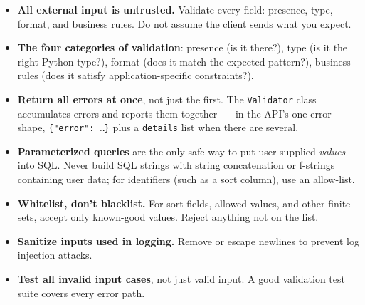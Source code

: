 \label{31-input-handling:key-takeaways}
\begin{takeaways}

\begin{itemize}
\tightlist
\item
  \textbf{All external input is untrusted.} Validate every field: presence, type, format, and business rules. Do not assume the client sends what you expect.
\item
  \textbf{The four categories of validation}: presence (is it there?), type (is it the right Python type?), format (does it match the expected pattern?), business rules (does it satisfy application-specific constraints?).
\item
  \textbf{Return all errors at once}, not just the first. The \texttt{Validator} class accumulates errors and reports them together~--- in the API's one error shape, \texttt{\{"error":\ …\}} plus a \texttt{details} list when there are several.
\item
  \textbf{Parameterized queries} are the only safe way to put user-supplied \emph{values} into SQL. Never build SQL strings with string concatenation or f-strings containing user data; for identifiers (such as a sort column), use an allow-list.
\item
  \textbf{Whitelist, don't blacklist.} For sort fields, allowed values, and other finite sets, accept only known-good values. Reject anything not on the list.
\item
  \textbf{Sanitize inputs used in logging.} Remove or escape newlines to prevent log injection attacks.
\item
  \textbf{Test all invalid input cases}, not just valid input. A good validation test suite covers every error path.
\end{itemize}

\end{takeaways}

\label{31-input-handling:exercises}


